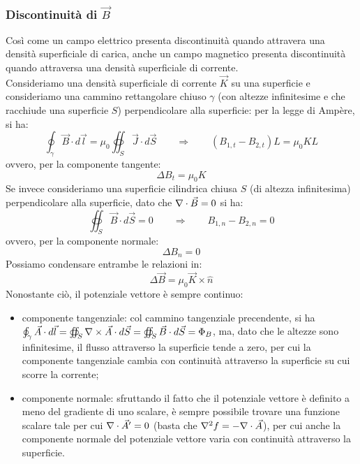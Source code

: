 \subsubsection{Discontinuità di $ \vec{B} $}

Così come un campo elettrico presenta discontinuità quando attravera una densità superficiale di carica, anche un campo magnetico presenta discontinuità quando attraversa una densità superficiale di corrente. \\ 
%
Consideriamo una densità superficiale di corrente $ \vec{K} $ su una superficie e consideriamo una cammino rettangolare chiuso $ \gamma $ (con altezze infinitesime e che racchiude una superficie $ S $) perpendicolare alla superficie: per la legge di Ampère, si ha:
\begin{equation}
	\oint_{\gamma} \vec{B}\cdot d\vec{l} = \mu_0 \oiint_S \vec{J}\cdot d\vec{S} \qquad\Longrightarrow\qquad (B_{1,t} - B_{2,t}) L = \mu_0 KL
	\label{eq:15}
\end{equation}
ovvero, per la componente tangente:
\begin{equation}
	\Delta B_t = \mu_0 K
	\label{eq:16}
\end{equation}
Se invece consideriamo una superficie cilindrica chiusa $ S $ (di altezza infinitesima) perpendicolare alla superficie, dato che $ \nabla\cdot\vec{B} = 0 $ si ha:
\begin{equation}
	\oiint_S \vec{B}\cdot d\vec{S} = 0 \qquad\Longrightarrow\qquad B_{1,n} - B_{2,n} = 0 
	\label{eq:17}
\end{equation}
ovvero, per la componente normale:
\begin{equation}
	\Delta B_n = 0 
	\label{eq:18}
\end{equation}
Possiamo condensare entrambe le relazioni in:
\begin{equation}
	\Delta\vec{B} = \mu_0 \vec{K}\times\hat{n}
	\label{eq:19}
\end{equation}
Nonostante ciò, il potenziale vettore è sempre continuo:
\begin{itemize}
	\item componente tangenziale: col cammino tangenziale precendente, si ha $ \oint_{\gamma} \vec{A}\cdot d\vec{l} = \oiint_S \nabla\times\vec{A}\cdot d\vec{S} = \oiint_S \vec{B}\cdot d\vec{S} = \Phi_B $, ma, dato che le altezze sono infinitesime, il flusso attraverso la superficie tende a zero, per cui la componente tangenziale cambia con continuità attraverso la superficie su cui scorre la corrente;
	\item componente normale: sfruttando il fatto che il potenziale vettore è definito a meno del gradiente di uno scalare, è sempre possibile trovare una funzione scalare tale per cui $ \nabla\cdot\vec{A}' = 0 $ (basta che $ \nabla^2 f = -\nabla\cdot\vec{A} $), per cui anche la componente normale del potenziale vettore varia con continuità attraverso la superficie.
\end{itemize}

